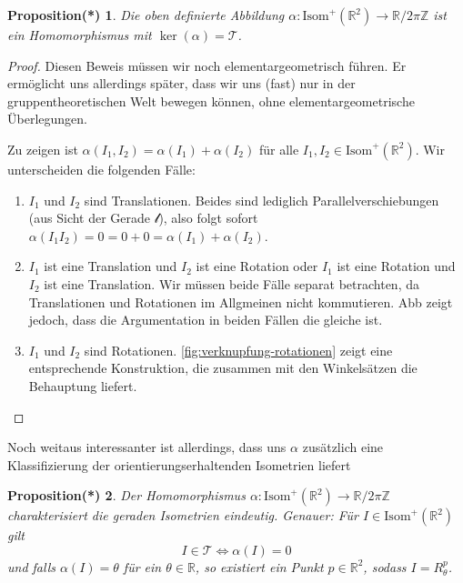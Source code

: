 \documentclass[a4paper, ngerman]{article}
\newcounter{chapter}
\numberwithin{equation}{chapter}
\theoremstyle{plain}
\newtheorem{propositionstrd}{Proposition(*)}[chapter]
\theoremstyle{definition}
\newcommand{\geradisometr}{\ensuremath{\mathrm{Isom}^+(\mathbb R^2)}}
\newcommand{\anm}[1]{{\color{red} #1}}
\begin{document}
\begin{propositionstrd}\label{prop*:homomorphismus-alpha}
    Die oben definierte Abbildung \(\alpha: \geradisometr\to \mathbb R/2\pi\mathbb Z\) ist ein Homomorphismus mit \(\ker(\alpha) = \mathcal T\). 
\end{propositionstrd}
\begin{proof}
    Diesen Beweis müssen wir noch elementargeometrisch führen. Er ermöglicht uns allerdings später, dass wir uns (fast) nur in der gruppentheoretischen Welt bewegen können, ohne elementargeometrische Überlegungen. 

    Zu zeigen ist \(\alpha(I_1, I_2) = \alpha(I_1) + \alpha(I_2)\) für alle \(I_1, I_2 \in \geradisometr\). Wir unterscheiden die folgenden Fälle:
    \begin{enumerate}
        \item \(I_1\) und \(I_2\) sind Translationen. Beides sind lediglich Parallelverschiebungen (aus Sicht der Gerade \(\mathscr l\)), also folgt sofort \(\alpha(I_1 I_2) = 0 = 0+0 = \alpha(I_1) + \alpha(I_2)\). 
        \item \(I_1\) ist eine Translation und \(I_2\) ist eine Rotation oder \(I_1\) ist eine Rotation und \(I_2\) ist eine Translation. Wir müssen beide Fälle separat betrachten, da Translationen und Rotationen im Allgmeinen nicht kommutieren. \anm{Abb} zeigt jedoch, dass die Argumentation in beiden Fällen die gleiche ist. 
        \item \(I_1\) und \(I_2\) sind Rotationen. \cref{fig:verknupfung-rotationen} zeigt eine entsprechende Konstruktion, die zusammen mit den Winkelsätzen die Behauptung liefert. 
    \end{enumerate}
\end{proof}
\noindent Noch weitaus interessanter ist allerdings, dass uns \(\alpha\) zusätzlich eine Klassifizierung der orientierungserhaltenden Isometrien liefert
\begin{propositionstrd}\label{prop*:gruppentheo-klassifikation-gerader-isometrien}
    Der Homomorphismus \(\alpha: \mathrm{Isom}^+ (\mathbb R^2) \to \mathbb R/2\pi\mathbb Z\) charakterisiert die geraden Isometrien eindeutig. Genauer: Für \(I \in \geradisometr\) gilt 
    \begin{equation*}
        I \in \mathcal T \iff \alpha(I) = 0
    \end{equation*}
    und falls \(\alpha(I) = \theta\) für ein \(\theta \in \mathbb R\), so existiert ein Punkt \(p \in \mathbb R^2\), sodass \(I = R_\theta^p\). 
\end{propositionstrd}
\end{document}
